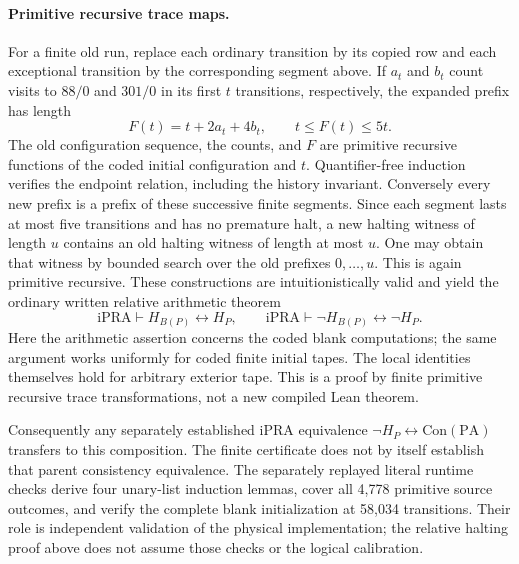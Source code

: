 \paragraph{Primitive recursive trace maps.}
For a finite old run, replace each ordinary transition by its copied row
and each exceptional transition by the corresponding segment above.
If $a_t$ and $b_t$ count visits to $88/0$ and $301/0$ in its first $t$
transitions, respectively, the expanded prefix has length
\[
 F(t)=t+2a_t+4b_t,\qquad t\le F(t)\le5t.
\]
The old configuration sequence, the counts, and $F$ are primitive
recursive functions of the coded initial configuration and $t$.
Quantifier-free induction verifies the endpoint relation, including the
history invariant.  Conversely every new prefix is a prefix of these
successive finite segments.  Since each segment lasts at most five
transitions and has no premature halt, a new halting witness of length
$u$ contains an old halting witness of length at most $u$.
One may obtain that witness by bounded search over the old prefixes
$0,\ldots,u$.  This is again primitive recursive.  These constructions
are intuitionistically valid and yield the ordinary written relative
arithmetic theorem
\[
 \mathrm{iPRA}\vdash
 H_{B(P)}\leftrightarrow H_P,
 \qquad
 \mathrm{iPRA}\vdash
 \neg H_{B(P)}\leftrightarrow\neg H_P.
\]
Here the arithmetic assertion concerns the coded blank computations;
the same argument works uniformly for coded finite initial tapes.
The local identities themselves hold for arbitrary exterior tape.
This is a proof by finite primitive recursive trace transformations,
not a new compiled Lean theorem.

Consequently any separately established iPRA equivalence
$\neg H_P\leftrightarrow\mathrm{Con}(\mathrm{PA})$ transfers to this
composition.  The finite certificate does not by itself establish that
parent consistency equivalence.  The separately replayed literal
runtime checks derive four unary-list induction lemmas, cover all 4,778
primitive source outcomes, and verify the complete blank initialization
at 58,034 transitions.  Their role is independent validation of the
physical implementation; the relative halting proof above does not
assume those checks or the logical calibration.

